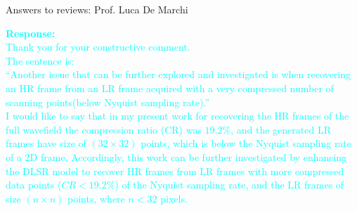 \documentclass[10pt,aspectratio=169,dvipsnames]{beamer} %
\begin{document}
\begin{frame}{Answers to reviews: Prof. Luca De Marchi}
\begin{itemize}
{			\textcolor{Cyan}{
				\textbf{Response:} \\
				Thank you for your constructive comment. \\
				The sentence is:\\
				\enquote{Another issue that can be further explored and investigated is when recovering an HR frame from an LR frame acquired with a very compressed number of scanning points(below Nyquist sampling rate).}
				\\
				I would like to say that in my present work for recovering the HR frames of the full wavefield the compression ratio (CR) was $19.2\%$, and the generated LR frames have size of \((32\times32)\) points, which is below the Nyquist sampling rate of a 2D frame.
				Accordingly, this work can be further investigated by enhancing the DLSR model to recover HR frames from LR frames with more compressed data points ($CR<19.2\%$) of the Nyquist sampling rate, and the LR frames of size \((n\times n)\) points, where \(n <32\) pixels.
			}}
		\end{itemize}
	\end{frame}
\end{document}
